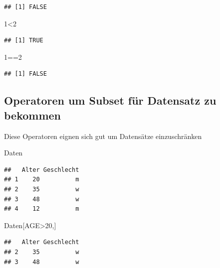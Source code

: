 \documentclass[]{article}
\newenvironment{Shaded}{\begin{snugshade}}{\end{snugshade}}
\newcommand{\DecValTok}[1]{\textcolor[rgb]{0.00,0.00,0.81}{{#1}}}
\newcommand{\NormalTok}[1]{{#1}}
\begin{document}
\begin{verbatim}
## [1] FALSE
\end{verbatim}

\begin{Shaded}
\begin{Highlighting}[]
\DecValTok{1}\NormalTok{<}\DecValTok{2}
\end{Highlighting}
\end{Shaded}

\begin{verbatim}
## [1] TRUE
\end{verbatim}

\begin{Shaded}
\begin{Highlighting}[]
\DecValTok{1}\NormalTok{==}\DecValTok{2}
\end{Highlighting}
\end{Shaded}

\begin{verbatim}
## [1] FALSE
\end{verbatim}

\subsection{Operatoren um Subset für Datensatz zu
bekommen}\label{operatoren-um-subset-fur-datensatz-zu-bekommen}

Diese Operatoren eignen sich gut um Datensätze einzuschränken

\begin{Shaded}
\begin{Highlighting}[]
\NormalTok{Daten}
\end{Highlighting}
\end{Shaded}

\begin{verbatim}
##   Alter Geschlecht
## 1    20          m
## 2    35          w
## 3    48          w
## 4    12          m
\end{verbatim}

\begin{Shaded}
\begin{Highlighting}[]
\NormalTok{Daten[AGE>}\DecValTok{20}\NormalTok{,]}
\end{Highlighting}
\end{Shaded}

\begin{verbatim}
##   Alter Geschlecht
## 2    35          w
## 3    48          w
\end{verbatim}
\end{document}

